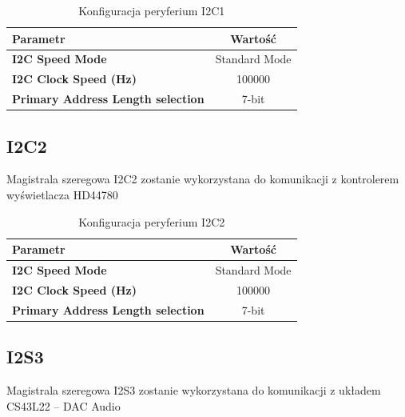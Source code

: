 \documentclass[10pt, a4paper]{article}
\begin{document}
\begin{table}[H]
	\centering
	\begin{tabular}{|l|c|} \hline
		\textbf{Parametr} & Wartość \\
		\hline
		\hline  \textbf{I2C Speed Mode}& Standard Mode \\  \hline
		\textbf{I2C Clock Speed (Hz) } & 100000 \\
		
		\hline  \textbf{Primary Address Length selection}& 7-bit  \\\hline

	\end{tabular}
	\caption{Konfiguracja peryferium I2C1}
	\label{tab:USART}
\end{table}
\subsection{I2C2}

Magistrala szeregowa I2C2 zostanie wykorzystana do komunikacji z kontrolerem wyświetlacza HD44780 

\begin{table}[H]
	\centering
	\begin{tabular}{|l|c|} \hline
		\textbf{Parametr} & Wartość \\
		\hline
		\hline  \textbf{I2C Speed Mode}& Standard Mode \\  \hline
		\textbf{I2C Clock Speed (Hz) } & 100000 \\
		
		\hline  \textbf{Primary Address Length selection}& 7-bit  \\\hline

	\end{tabular}
	\caption{Konfiguracja peryferium I2C2}
	\label{tab:USART}
\end{table}
\subsection{I2S3}

Magistrala szeregowa I2S3 zostanie wykorzystana do komunikacji z układem CS43L22 -- DAC Audio 
\end{document}
